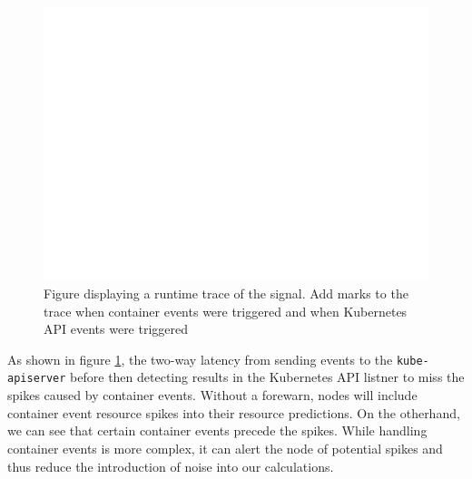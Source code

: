 \begin{figure}[h]
    \centering
    \includegraphics[width=\textwidth]{images/blank.pdf}
    \caption{Figure displaying a runtime trace of the signal. Add marks to the
    trace when container events were triggered and when Kubernetes API events
    were triggered}
    \label{eval-listner}
\end{figure}
As shown in figure \ref{eval-listner}, the two-way latency from sending events
to the \verb|kube-apiserver| before then detecting results in the Kubernetes API
listner to miss the spikes caused by container events. Without a forewarn, nodes
will include container event resource spikes into their resource predictions. On
the otherhand, we can see that certain container events precede the spikes.
While handling container events is more complex, it can alert the node of
potential spikes and thus reduce the introduction of noise into our
calculations.


